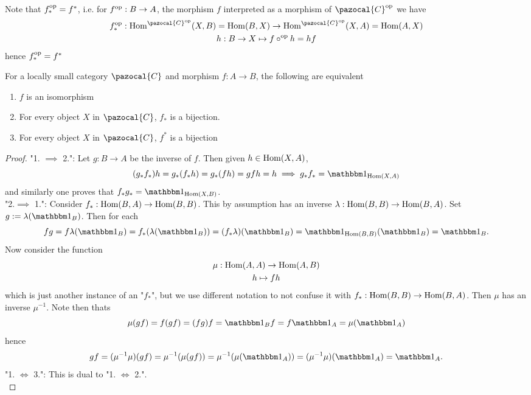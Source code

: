 \begin{remark}
    Note that $f^\mathrm{op}_\ast = f^\ast$, i.e. for $f^\mathrm{op} : B \rightarrow A$, the morphism $f$ interpreted as a morphism of $\pazocal{C}\op$ we have 
    \begin{gather*}
        f\op_\ast : \Hom^{\pazocal{C}\op}(X,B)=\Hom(B,X) \rightarrow \Hom^{\pazocal{C}\op}(X,A)=\Hom(A,X)\\
        h: B\rightarrow X \mapsto f\circ\op h= hf
    \end{gather*}
    hence $f^\mathrm{op}_\ast = f^\ast$
\end{remark}
\begin{lemma}
    For a locally small category $\pazocal{C}$ and morphism $f:A\rightarrow B$, the following are equivalent
    \begin{enumerate}
        \item $f$ is an isomorphism
        \item For every object $X$ in $\pazocal{C}$, $f_\ast$ is a bijection. 
        \item For every object $X$ in $\pazocal{C}$, $f^\ast$ is a bijection
    \end{enumerate}
\end{lemma}
\begin{proof}
    "1. $\implies$ 2.": Let $g : B\rightarrow A$ be the inverse of $f$. Then given $h\in \mathrm{Hom}(X,A)$,
    $$(g_\ast f_\ast)h = g_\ast(f_\ast h)= g_\ast(fh)=gfh=h \implies g_\ast f_\ast = \fone_{\Hom(X,A)}$$
    and similarly one proves that $f_\ast g_\ast = \fone_{\Hom(X,B)}$.\\
    "2.$\implies$ 1.": Consider $f_\ast : \mathrm{Hom}(B,A)\rightarrow \mathrm{Hom}(B,B)$. This by assumption has an inverse $\lambda : \mathrm{Hom}(B,B)\rightarrow \mathrm{Hom}(B,A)$. Set $g := \lambda(\fone_B)$. Then for each  
    $$fg = f \lambda(\fone_B)= f_\ast(\lambda(\fone_B))=(f_\ast\lambda)(\fone_B)=\fone_{\Hom(B,B)}(\fone_B)=\fone_B.$$
    Now consider the function 
    \begin{gather*}
        \mu : \mathrm{Hom}(A,A)\rightarrow \mathrm{Hom}(A,B)\\
        h\mapsto fh
    \end{gather*}
    which is just another instance of an "$f_\ast$", but we use different notation to not confuse it with $f_\ast: \mathrm{Hom}(B,B)\rightarrow \mathrm{Hom}(B,A)$. Then $\mu$ has an inverse $\mu^{-1}$. Note then thats
    $$
        \mu(gf)= f(gf)=(fg)f= \fone_B f = f\fone_A= \mu(\fone_A)
    $$
    hence 
    $$
        gf = (\mu^{-1}\mu)(gf) = \mu^{-1}(\mu(gf)) = \mu^{-1}(\mu(\fone_A))= (\mu^{-1}\mu)(\fone_A) = \fone_A.
    $$
    "1. $\iff$ 3.": This is dual to "1. $\iff$ 2.".\\
\end{proof}
